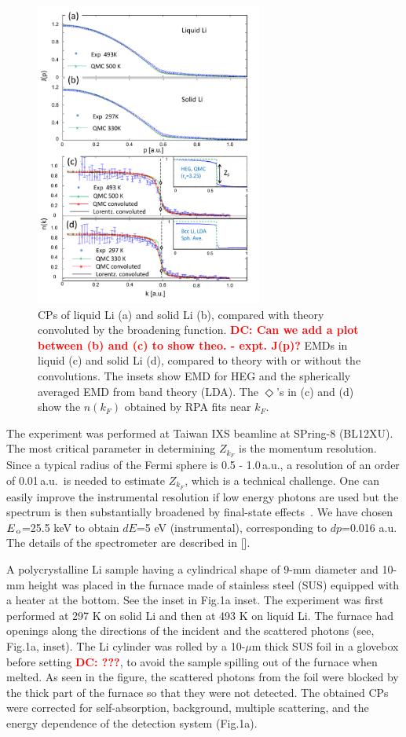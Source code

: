 \documentclass[twocolumn,showpacs,showkeys,fleqn,prl,superscriptaddress]{revtex4}%
\newcommand{\nn}[1]{\textnormal{ #1}}
\newcommand{\dc}[1]{\textcolor{red}{\textbf{DC: #1}}}
\begin{document}
\begin{figure}
\includegraphics[bb= 50 10 500 720, width=7.5cm]{fig2.pdf}
\caption{CPs of liquid Li (a) and solid Li (b), compared with theory convoluted by the broadening function. \dc{Can we add a plot between (b) and (c) to show theo. - expt. J(p)?} EMDs in liquid (c) and solid Li (d), compared to theory with or without the convolutions. The insets show EMD for HEG and the spherically averaged EMD from band theory (LDA). The $\Diamond$'s in (c) and (d)  show the $n(k_F)$ obtained by RPA fits near $k_F$.}
\label{Fig.2}
\end{figure}

The experiment was performed at Taiwan IXS beamline at SPring-8 (BL12XU).
The most critical parameter in determining $Z_{k_F}$ is the momentum resolution.
Since a typical radius of the Fermi sphere is 0.5 - 1.0\,a.u., a resolution of an order of 0.01\,a.u.\, is needed to estimate $Z_{k_F}$, which is a technical challenge.
One can easily improve the instrumental resolution if low energy photons are used but the spectrum is then substantially broadened by final-state effects~\cite{stern00,soi01}.
We have chosen $E_{\nn{\!o}}$=25.5 keV to obtain $dE$=5 eV (instrumental), corresponding to $dp$=0.016 a.u.
The details of the spectrometer are described in [].

A polycrystalline Li sample having a cylindrical shape of 9-mm diameter and 10-mm height was placed in the furnace made of stainless steel (SUS) equipped with a heater at the bottom. See the inset in Fig.1a inset.
The experiment was first performed at 297 K on solid Li and then at 493 K on liquid Li.
The furnace had openings along the directions of the incident and the scattered photons (see, Fig.1a, inset).
The Li cylinder was rolled by a 10-$\mu$m thick SUS foil in a glovebox before setting \dc{???}, to avoid the sample spilling out of the furnace when melted.
As seen in the figure, the scattered photons from the foil were blocked by the thick part of the furnace so that they were not detected.
The obtained CPs were corrected for self-absorption, background, multiple scattering, and the energy dependence of the detection system (Fig.1a).
\end{document}
